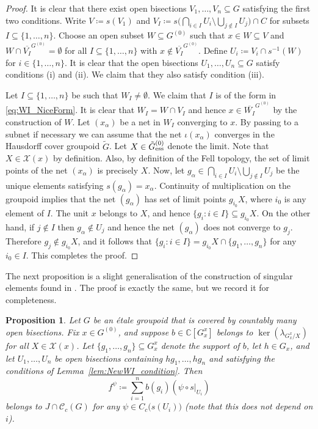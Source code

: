 \documentclass[11pt, oneside, reqno]{amsart}
\newcommand{\Gu}{G^{(0)}}
\newcommand{\cg}{\mathscr{C}_c(G)}
\newcommand{\ess}{{\rm{ess}}}
\newcommand{\tiGu}{\tilde{G}^{(0)}}
\newtheorem{prp}[thm]{Proposition}
\theoremstyle{definition}
\theoremstyle{remark}
\numberwithin{equation}{section}
\begin{document}
\begin{proof}
    It is clear that there exist open bisections $V_1, \dots, V_n \subseteq G$ satisfying the first two conditions. Write $V \coloneq s(V_1)$ and $V_I \coloneq s\big( \bigcap_{i \in I} U_i \setminus \bigcup_{j \notin I} U_j \big) \cap C$ for subsets $I \subseteq \{1, \dots, n\}$. Choose an open subset $W \subseteq \Gu$ such that $x \in W \subseteq V$ and $W \cap \overline{V_I}^{\Gu} = \emptyset$ for all $I \subseteq \{1, \dotsc, n\}$ with $x \notin \overline{V_I}^{\Gu}$. Define $U_i \coloneq V_i \cap s^{-1}(W)$ for $i \in \{1, \dots, n\}$. It is clear that the open bisections $U_1, \dots, U_n \subseteq G$ satisfy conditions (i) and (ii). We claim that they also satisfy condition (iii).

    Let $I \subseteq \{1, \dots, n\}$ be such that $W_I \neq \emptyset$. We claim that $I$ is of the form in \eqref{eq:WI_NiceForm}. It is clear that $W_I = W \cap V_I$ and hence $x \in \overline{W_I}^{\Gu}$ by the construction of $W$. Let $(x_\alpha)$ be a net in $W_I$ converging to $x$. By passing to a subnet if necessary we can assume that the net $\iota(x_\alpha)$ converges in the Hausdorff cover groupoid $\tilde{G}$. Let $X \in \tiGu_\ess$ denote the limit. Note that $X \in \mathcal{X}(x)$ by definition. Also, by definition of the Fell topology, the set of limit points of the net $(x_\alpha)$ is precisely $X$. Now, let $g_\alpha \in \bigcap_{i \in I} U_i \setminus \bigcup_{j \notin I} U_j$ be the unique elements satisfying $s(g_\alpha) = x_\alpha$. Continuity of multiplication on the groupoid implies that the net $(g_\alpha)$ has set of limit points $g_{i_0} X$, where $i_0$ is any element of $I$. The unit $x$ belongs to $X$, and hence $\{g_i \colon i \in I\} \subseteq g_{i_0} X$. On the other hand, if $j \notin I$ then $g_\alpha \notin U_j$ and hence the net $(g_\alpha)$ does not converge to $g_j$. Therefore $g_j \notin g_{i_0} X$, and it follows that $\{g_i \colon i \in I\} = g_{i_0}X\cap \{g_1, \dots, g_n\}$ for any $i_0 \in I$. This completes the proof.
\end{proof}

The next proposition is a slight generalisation of the construction of singular elements found in \cite[Proposition~5.19]{Hume}. The proof is exactly the same, but we record it for completeness.

\begin{prp}\label{NewCutting}
    Let $G$ be an \'etale groupoid that is covered by countably many open bisections. Fix $x \in \Gu$, and suppose $b \in \mathbb{C}[G^x_x]$ belongs to $\ker(\lambda_{G^x_x/X})$ for all $X \in \mathcal{X}(x)$. Let $\{g_1, \dots, g_n\} \subseteq G^x_x$ denote the support of $b$, let $h \in G_x$, and let $U_1, \dots, U_n$ be open bisections containing $hg_1, \dots, hg_n$ and satisfying the conditions of Lemma~\ref{lem:NewWI_condition}. Then
    \begin{equation}
    \label{f^psi}
    f^\psi \coloneq \sum_{i = 1}^n b(g_i) (\psi \circ s \vert_{U_i})
    \end{equation}
    belongs to $J \cap \cg$ for any $\psi \in C_c\big(s(U_i)\big)$ (note that this does not depend on $i$).
\end{prp}
\end{document}
